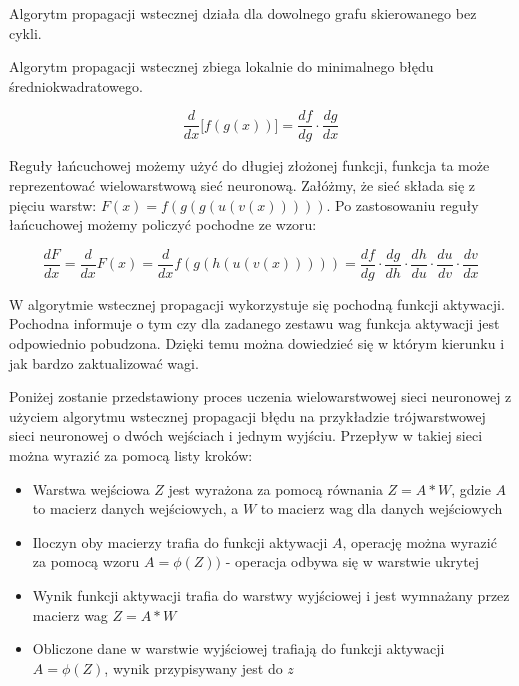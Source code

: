\begin{fact}
	Algorytm propagacji wstecznej działa dla dowolnego grafu skierowanego bez cykli.
\end{fact}

\begin{twierdzenie}
	Algorytm propagacji wstecznej zbiega lokalnie do minimalnego błędu średniokwadratowego.
\end{twierdzenie}


\begin{equation}
\frac{d}{dx}
\big[ f(g(x)) \big] = \frac{df}{dg} \cdot \frac{dg}{dx}
\end{equation}

	Reguły łańcuchowej możemy użyć do długiej złożonej funkcji, funkcja ta może reprezentować wielowarstwową sieć neuronową. Załóżmy, że sieć składa się z pięciu warstw: $F(x)= f(g(g(u(v(x)))))$. Po zastosowaniu reguły łańcuchowej możemy policzyć pochodne ze wzoru:
	
	\begin{equation}
		\frac{dF}{dx} = \frac{d}{dx}F(x)=\frac{d}{dx}f(g(h(u(v(x))))) = \frac{df}{dg} \cdot \frac{dg}{dh} \cdot \frac{dh}{du} \cdot \frac{du}{dv} \cdot \frac{dv}{dx}
	\end{equation}
	
	W algorytmie wstecznej propagacji wykorzystuje się pochodną funkcji aktywacji. Pochodna informuje o tym czy dla zadanego zestawu wag funkcja aktywacji jest odpowiednio pobudzona. Dzięki temu można dowiedzieć się w którym kierunku i jak bardzo zaktualizować wagi.
	
	Poniżej zostanie przedstawiony proces uczenia wielowarstwowej sieci neuronowej z użyciem algorytmu wstecznej propagacji błędu na przykładzie trójwarstwowej sieci neuronowej o dwóch wejściach i jednym wyjściu. Przepływ w takiej sieci można wyrazić za pomocą listy kroków:
	
	\begin{itemize}
		\item Warstwa wejściowa $Z$  jest wyrażona za pomocą równania $Z = A * W$, gdzie $A$ to macierz danych wejściowych, a $W$ to macierz wag dla danych wejściowych
		\item Iloczyn oby macierzy trafia do funkcji aktywacji $A$, operację można wyrazić za pomocą wzoru $A = \phi(Z))$ - operacja odbywa się w warstwie ukrytej
		\item Wynik funkcji aktywacji trafia do warstwy wyjściowej i jest wymnażany przez macierz wag $Z = A * W$
		\item Obliczone dane w warstwie wyjściowej trafiają do funkcji aktywacji $A = \phi(Z)$, wynik przypisywany jest do $z$
	\end{itemize}

